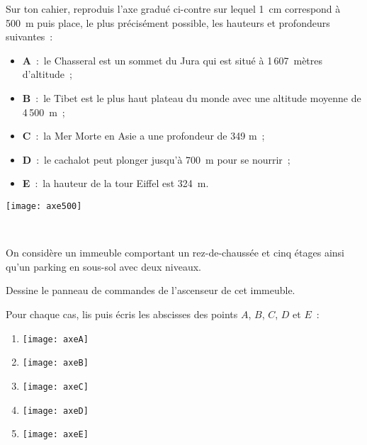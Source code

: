 \begin{exercice}
Sur ton cahier, reproduis l'axe gradué ci-contre sur lequel 1 cm correspond à 500 m puis place, le plus précisément possible, les hauteurs et profondeurs suivantes :

\begin{minipage}[c]{0.8\linewidth}
\begin{itemize}
 \item \textbf{A} : le Chasseral est un sommet du Jura qui est situé à 1\,607 mètres d'altitude ;
 \item \textbf{B} : le Tibet est le plus haut plateau du monde avec une altitude moyenne de 4\,500 m ;
 \item \textbf{C} : la Mer Morte en Asie a une profondeur de 349 m ;
 \item \textbf{D} : le cachalot peut plonger jusqu'à 700 m pour se nourrir ;
 \item \textbf{E} : la hauteur de la tour Eiffel est 324 m.
 \end{itemize}
 \end{minipage} \hfill%
 \begin{minipage}[c]{0.15\linewidth}
 \texttt{[image: axe500]}
  \end{minipage} \\
\end{exercice}


\begin{exercice}
On considère un immeuble comportant un rez-de-chaussée et cinq étages ainsi qu'un parking en sous-sol avec deux niveaux. 

Dessine le panneau de commandes de l'ascenseur de cet immeuble.
\end{exercice}



\begin{exercice}[Abscisses]
Pour chaque cas, lis puis écris les abscisses des points $A$, $B$, $C$, $D$ et $E$ :
\begin{enumerate}
  \item \begin{center} \texttt{[image: axeA]} \end{center}
  \item \begin{center} \texttt{[image: axeB]} \end{center}
  \item \begin{center} \texttt{[image: axeC]} \end{center}
  \item \begin{center} \texttt{[image: axeD]} \end{center}
  \item \begin{center} \texttt{[image: axeE]} \end{center}
 \end{enumerate}
\end{exercice}


